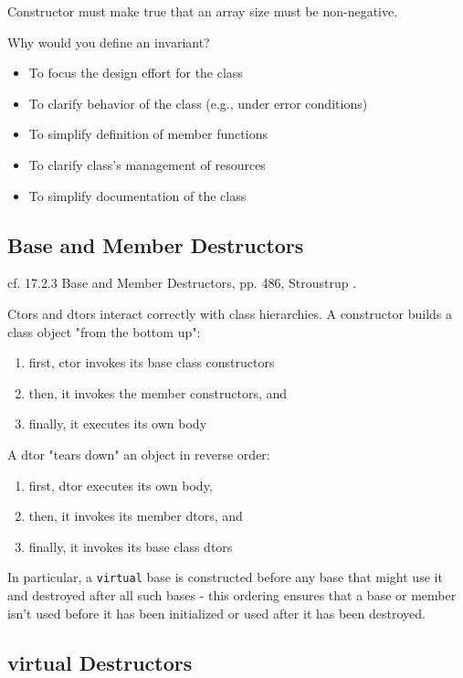 \documentclass[10pt]{amsart}
\begin{document}
\begin{multicols*}{2}
Constructor must make true that an array size must be non-negative.

Why would you define an invariant?
\begin{itemize}
	\item To focus the design effort for the class
	\item To clarify behavior of the class (e.g., under error conditions)
	\item To simplify definition of member functions
	\item To clarify class's management of resources
	\item To simplify documentation of the class
\end{itemize}

\subsection{Base and Member Destructors}

cf. 17.2.3 Base and Member Destructors, pp. 486, Stroustrup \cite{Stro2013}.

Ctors and dtors interact correctly with class hierarchies. A constructor builds a class object "from the bottom up":
\begin{enumerate}
	\item first, ctor invokes its base class constructors
	\item then, it invokes the member constructors, and
	\item finally, it executes its own body
\end{enumerate}
A dtor "tears down" an object in reverse order:
\begin{enumerate}
	\item first, dtor executes its own body,
	\item then, it invokes its member dtors, and
	\item finally, it invokes its base class dtors
\end{enumerate}

In particular, a \verb|virtual| base is constructed before any base that might use it and destroyed after all such bases - this ordering ensures that a base or member isn't used before it has been initialized or used after it has been destroyed.

\subsection{virtual Destructors}


\end{multicols*}
\end{document}
